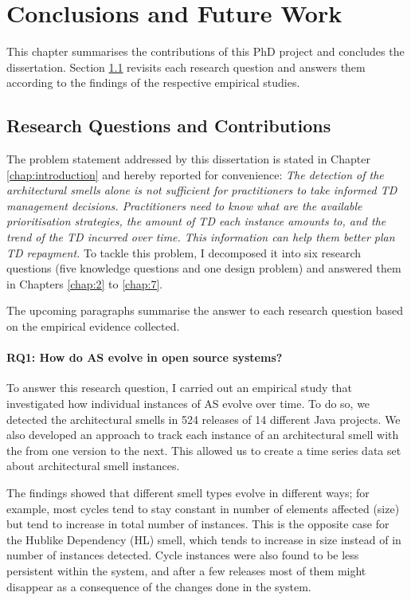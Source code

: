 \setlength{\headheight}{1.2cm}
\renewcommand{\publ}{\flushleft\footnotesize{}}

\chapter{Conclusions and Future Work}\label{chap:8}
This chapter summarises the contributions of this PhD project and concludes the dissertation.
Section \ref{c8:sec:rq-contributions} revisits each research question and answers them according to the findings of the respective empirical studies.

\section{Research Questions and Contributions}\label{c8:sec:rq-contributions}
The problem statement addressed by this dissertation is stated in Chapter \ref{chap:introduction} and hereby reported for convenience: \textit{The detection of the architectural smells alone is not sufficient for practitioners to take informed TD management decisions. Practitioners need to know what are the available prioritisation strategies, the amount of TD each instance amounts to, and the trend of the TD incurred over time. This information can help them better plan TD repayment.}
To tackle this problem, I decomposed it into six research questions (five knowledge questions and one design problem) and answered them in Chapters \ref{chap:2} to \ref{chap:7}.

The upcoming paragraphs summarise the answer to each research question based on the empirical evidence collected.

\subsubsection*{RQ1: How do AS evolve in open source systems?}
To answer this research question, I carried out an empirical study that investigated how individual instances of AS evolve over time.
To do so, we detected the architectural smells in 524 releases of 14 different Java projects. 
We also developed an approach to track each instance of an architectural smell with the from one version to the next.
This allowed us to create a time series data set about architectural smell instances.

The findings showed that different smell types evolve in different ways; for example, most cycles tend to stay constant in number of elements affected (size) but tend to increase in total number of instances.
This is the opposite case for the Hublike Dependency (HL) smell, which tends to increase in size instead of in number of instances detected.
Cycle instances were also found to be less persistent within the system, and after a few releases most of them might disappear as a consequence of the changes done in the system.

